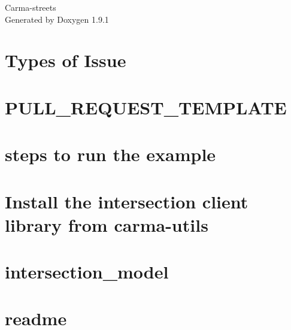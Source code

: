 \let\mypdfximage\pdfximage\def\pdfximage{\immediate\mypdfximage}\documentclass[twoside]{book}
\newcommand{\+}{\discretionary{\mbox{\scriptsize$\hookleftarrow$}}{}{}}
\newcommand{\clearemptydoublepage}{%
  \newpage{\pagestyle{empty}\cleardoublepage}%
}
\begin{document}
\raggedbottom

\hypersetup{pageanchor=false,
             bookmarksnumbered=true,
             pdfencoding=unicode
            }
\begin{titlepage}
\vspace*{7cm}
\begin{center}%
{\Large Carma-\/streets }\\
\vspace*{1cm}
{\large Generated by Doxygen 1.9.1}\\
\end{center}
\end{titlepage}
\clearemptydoublepage
{}
\tableofcontents
\clearemptydoublepage
{}
\hypersetup{pageanchor=true}

\chapter{Types of Issue}
\label{md_docs_ISSUE_TEMPLATE}

\chapter{PULL\+\_\+\+REQUEST\+\_\+\+TEMPLATE}
\label{md_docs_PULL_REQUEST_TEMPLATE}

\chapter{steps to run the example}
\label{md_examples_kafka_examples_readme}

\chapter{Install the intersection client library from carma-\/utils}
\label{md_examples_qt_rest_clients_api_intersection_client_README}

\chapter{intersection\+\_\+model}
\label{md_intersection_model_readme}

\chapter{readme}
\label{md_kafka_clients_readme}

\end{document}
